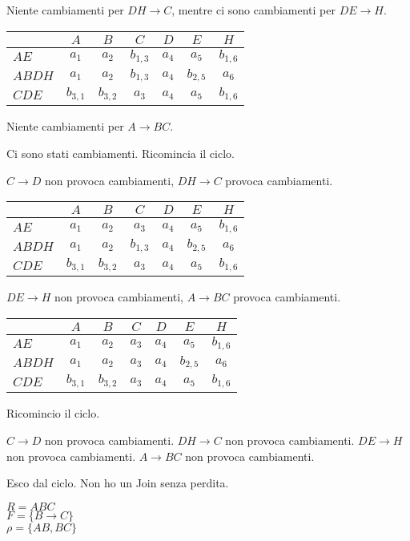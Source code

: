 \begin{exmp}
Niente cambiamenti per $DH \to C$, mentre ci sono cambiamenti per $DE \to H$.

\begin{tabular}{l|*{6}{c}}
& $A$ & $B$ & $C$ & $D$ & $E$ & $H$ \\
\hline
$AE$ & $a_1$ & $a_2$ & $b_{1,3}$ & $a_4$ & $a_5$ & $b_{1,6}$ \\
$ABDH$ & $a_1$ & $a_2$ & $b_{1,3}$ & $a_4$ & $b_{2,5}$ & $a_6$ \\
$CDE$ & $b_{3,1}$ & $b_{3,2}$ & $a_3$ & $a_4$ & $a_5$ & \cellcolor{green!20} $b_{1,6}$
\end{tabular}

Niente cambiamenti per $A \to BC$.

Ci sono stati cambiamenti. Ricomincia il ciclo.

$C \to D$ non provoca cambiamenti, $DH \to C$ provoca cambiamenti.

\begin{tabular}{l|*{6}{c}}
& $A$ & $B$ & $C$ & $D$ & $E$ & $H$ \\
\hline
$AE$ & $a_1$ & $a_2$ & \cellcolor{green!20} $a_3$ & $a_4$ & $a_5$ & $b_{1,6}$ \\
$ABDH$ & $a_1$ & $a_2$ & $b_{1,3}$ & $a_4$ & $b_{2,5}$ & $a_6$ \\
$CDE$ & $b_{3,1}$ & $b_{3,2}$ & $a_3$ & $a_4$ & $a_5$ & $b_{1,6}$
\end{tabular}

$DE \to H$ non provoca cambiamenti, $A \to BC$ provoca cambiamenti.

\begin{tabular}{l|*{6}{c}}
& $A$ & $B$ & $C$ & $D$ & $E$ & $H$ \\
\hline
$AE$ & $a_1$ & $a_2$ & $a_3$ & $a_4$ & $a_5$ & $b_{1,6}$ \\
$ABDH$ & $a_1$ & $a_2$ & \cellcolor{green!20} $a_3$ & $a_4$ & $b_{2,5}$ & $a_6$ \\
$CDE$ & $b_{3,1}$ & $b_{3,2}$ & $a_3$ & $a_4$ & $a_5$ & $b_{1,6}$
\end{tabular}

Ricomincio il ciclo.

$C \to D$ non provoca cambiamenti. $DH \to C$ non provoca cambiamenti. $DE \to H$ non provoca cambiamenti. $A \to BC$ non provoca cambiamenti.

Esco dal ciclo. Non ho un Join senza perdita.
\end{exmp}

\begin{esercizio}
$R = ABC$ \\ 
$F = \{ B \to C \}$ \\
$\rho = \{ AB, BC \}$
\end{esercizio}


